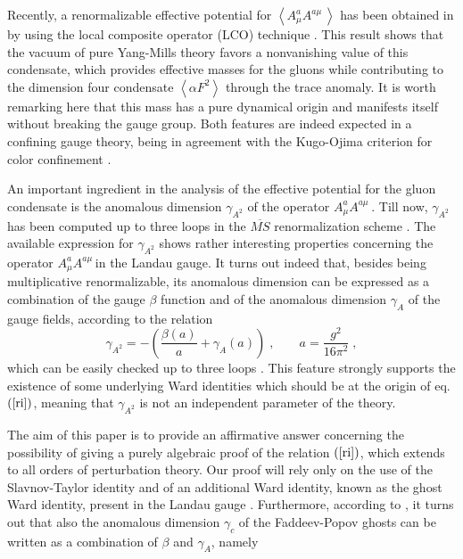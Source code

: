 \documentclass[a4paper,12pt]{article}
\begin{document}
Recently, a renormalizable effective potential for $\left\langle A_{\mu
}^{a}A^{a\mu \;}\right\rangle $ has been obtained in \cite{v} by using the
local composite operator (LCO) technique \cite{v1}. This result shows that
the vacuum of pure Yang-Mills theory favors a nonvanishing value of this
condensate, which provides effective masses for the gluons while
contributing to the dimension four condensate $\left\langle \alpha
F^{2}\right\rangle $ through the trace anomaly. It is worth remarking here
that this mass has a pure dynamical origin and manifests itself without
breaking the gauge group. Both features are indeed expected in a confining
gauge theory, being in agreement with the Kugo-Ojima criterion for color
confinement \cite{ko}.

An important ingredient in the analysis of the effective potential for the
gluon condensate is the anomalous dimension $\gamma _{A^{2}}$ of the
operator $A_{\mu }^{a}A^{a\mu \;}$. Till now, $\gamma _{A^{2}}$ has been
computed up to three loops in the $\overline{MS}$ renormalization scheme 
\cite{gr}. The available expression for $\gamma _{A^{2}}$ shows rather
interesting properties concerning the operator $A_{\mu }^{a}A^{a\mu \;}$in
the Landau gauge. It turns out indeed that, besides being multiplicative
renormalizable, its anomalous dimension can be expressed as a combination of
the gauge $\beta $ function and of the anomalous dimension $\gamma _{A}$ of
the gauge fields, according to the relation 
\begin{equation}
\gamma _{A^{2}}=-\left( \frac{\beta (a)}{a}+\gamma _{A}(a)\right)
\;,\;\;\;\;\;\;\;a=\frac{g^{2}}{16\pi ^{2}}\;,  \label{ri}
\end{equation}
which can be easily checked up to three loops \cite{gr}. This feature
strongly supports the existence of some underlying Ward identities which
should be at the origin of eq.$\left( \ref{ri}\right) $, meaning that $%
\gamma _{A^{2}}$ is not an independent parameter of the theory.

The aim of this paper is to provide an affirmative answer concerning the
possibility of giving a purely algebraic proof of the relation $\left( \ref
{ri}\right) $, which extends to all orders of perturbation theory. Our proof
will rely only on the use of the Slavnov-Taylor identity and of an
additional Ward identity, known as the ghost Ward identity, present in the
Landau gauge \cite{bps}. Furthermore, according to \cite{bps}, it turns out
that also the anomalous dimension $\gamma _{c}$ of the Faddeev-Popov ghosts
can be written as a combination of $\beta $ and $\gamma _{A}$, namely
\end{document}

